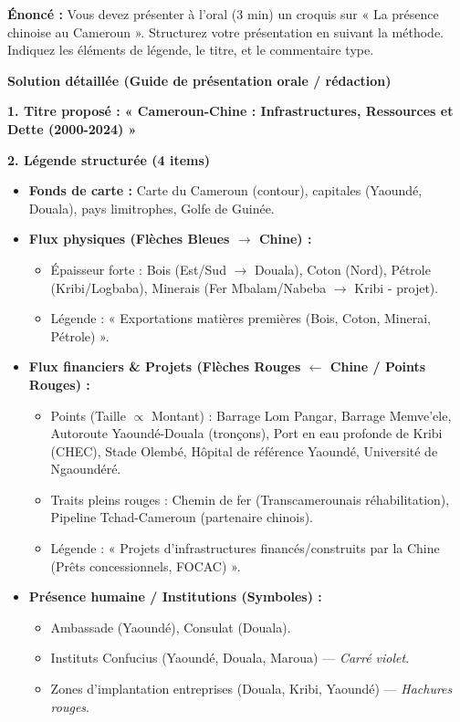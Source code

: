 \documentclass[11pt]{article}
\begin{document}
\begin{exoresolu}
\textbf{Énoncé :} Vous devez présenter à l'oral (3 min) un croquis sur « La présence chinoise au Cameroun ». Structurez votre présentation en suivant la méthode. Indiquez les éléments de légende, le titre, et le commentaire type.

\tcblower
\textbf{Solution détaillée (Guide de présentation orale / rédaction)}

\textbf{1. Titre proposé :} \textbf{« Cameroun-Chine : Infrastructures, Ressources et Dette (2000-2024) »}

\textbf{2. Légende structurée (4 items)}
\begin{itemize}
    \item \textbf{Fonds de carte :} Carte du Cameroun (contour), capitales (Yaoundé, Douala), pays limitrophes, Golfe de Guinée.
    \item \textbf{Flux physiques (Flèches Bleues $\rightarrow$ Chine) :} 
    \begin{itemize}
        \item Épaisseur forte : Bois (Est/Sud $\rightarrow$ Douala), Coton (Nord), Pétrole (Kribi/Logbaba), Minerais (Fer Mbalam/Nabeba $\rightarrow$ Kribi - projet).
        \item Légende : « Exportations matières premières (Bois, Coton, Minerai, Pétrole) ».
    \end{itemize}
    \item \textbf{Flux financiers \& Projets (Flèches Rouges $\leftarrow$ Chine / Points Rouges) :}
    \begin{itemize}
        \item Points (Taille $\propto$ Montant) : Barrage Lom Pangar, Barrage Memve'ele, Autoroute Yaoundé-Douala (tronçons), Port en eau profonde de Kribi (CHEC), Stade Olembé, Hôpital de référence Yaoundé, Université de Ngaoundéré.
        \item Traits pleins rouges : Chemin de fer (Transcamerounais réhabilitation), Pipeline Tchad-Cameroun (partenaire chinois).
        \item Légende : « Projets d'infrastructures financés/construits par la Chine (Prêts concessionnels, FOCAC) ».
    \end{itemize}
    \item \textbf{Présence humaine / Institutions (Symboles) :}
    \begin{itemize}
        \item Ambassade (Yaoundé), Consulat (Douala).
        \item Instituts Confucius (Yaoundé, Douala, Maroua) — \emph{Carré violet}.
        \item Zones d'implantation entreprises (Douala, Kribi, Yaoundé) — \emph{Hachures rouges}.
    \end{itemize}
\end{itemize}


\end{exoresolu}
\end{document}
